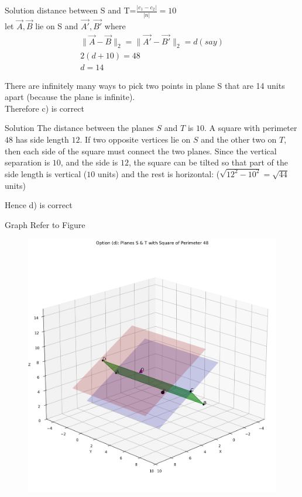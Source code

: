 \documentclass{beamer}
\begin{document}
\begin{frame}{Solution}
distance between S and T=$\frac{\lvert c_1 - c_2 \rvert}{|n|}
=10$\\
let $\vec{A},\vec{B}$ lie on S and $\vec{A'},\vec{B'}$
where 
\begin{align}
 \|\vec{A}-\vec{B}\|_2=\|\vec{A'}-\vec{B'}\|_2=d(say)\\
 2(d+10)=48\\
 d=14
\end{align}

There are infinitely many ways to pick two points in plane 
S that are 14 units apart (because the plane is infinite).\\
Therefore c) is correct
\end{frame}
\begin{frame}{Solution}
The distance between the planes $S$ and $T$ is $10$. A square with perimeter $48$ has side length $12$.  
If two opposite vertices lie on $S$ and the other two on $T$, then each side of the square must connect the two planes.  
Since the vertical separation is $10$, and the side is $12$, the square can be tilted so that part of the side length is vertical ($10$ units) and the rest is horizontal: ($\sqrt{12^2 - 10^2} = \sqrt{44}$ units)


Hence d) is correct
\end{frame}
\begin{frame}{Graph}
   Refer to Figure

\begin{figure}[H]
\begin{center}
\includegraphics[width=0.6\columnwidth]{../figs/graph5a.png}
\end{center}
\caption{}
\label{fig:Fig}
\end{figure}  
\end{frame}
\end{document}
